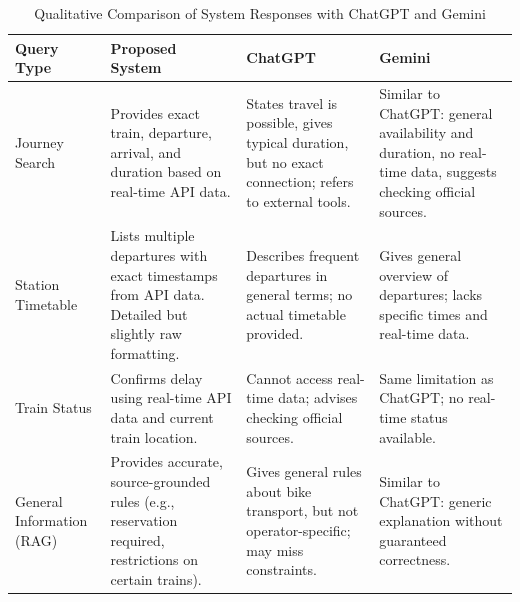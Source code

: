 \documentclass[fleqn,moreauthors,10pt]{ds_report}
\begin{document}
\begin{table}[t]
\centering
\caption{Qualitative Comparison of System Responses with ChatGPT and Gemini}
\label{tab:qualitative}
\begin{tabular}{p{3cm} p{4.5cm} p{4.5cm} p{4.5cm}}
\toprule
\textbf{Query Type} & \textbf{Proposed System} & \textbf{ChatGPT} & \textbf{Gemini} \\
\midrule

Journey Search &
Provides exact train, departure, arrival, and duration based on real-time API data. &
States travel is possible, gives typical duration, but no exact connection; refers to external tools. &
Similar to ChatGPT: general availability and duration, no real-time data, suggests checking official sources. \\

\midrule

Station Timetable &
Lists multiple departures with exact timestamps from API data. Detailed but slightly raw formatting. &
Describes frequent departures in general terms; no actual timetable provided. &
Gives general overview of departures; lacks specific times and real-time data. \\

\midrule

Train Status &
Confirms delay using real-time API data and current train location. &
Cannot access real-time data; advises checking official sources. &
Same limitation as ChatGPT; no real-time status available. \\

\midrule

General Information (RAG) &
Provides accurate, source-grounded rules (e.g., reservation required, restrictions on certain trains). &
Gives general rules about bike transport, but not operator-specific; may miss constraints. &
Similar to ChatGPT: generic explanation without guaranteed correctness. \\

\bottomrule
\end{tabular}
\end{table}




\end{document}
